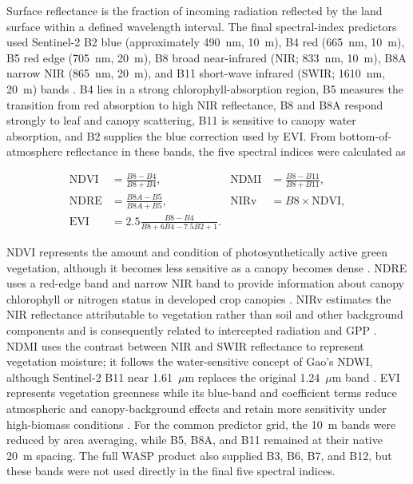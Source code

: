 Surface reflectance is the fraction of incoming radiation reflected by the land surface within a defined wavelength interval. The final spectral-index predictors used Sentinel-2 B2 blue (approximately 490~nm, 10~m), B4 red (665~nm, 10~m), B5 red edge (705~nm, 20~m), B8 broad near-infrared (NIR; 833~nm, 10~m), B8A narrow NIR (865~nm, 20~m), and B11 short-wave infrared (SWIR; 1610~nm, 20~m) bands \cite{hagolle_wasp_2018}. B4 lies in a strong chlorophyll-absorption region, B5 measures the transition from red absorption to high NIR reflectance, B8 and B8A respond strongly to leaf and canopy scattering, B11 is sensitive to canopy water absorption, and B2 supplies the blue correction used by EVI. From bottom-of-atmosphere reflectance in these bands, the five spectral indices were calculated as

\begin{align}
\mathrm{NDVI} &= \frac{B8-B4}{B8+B4},
&
\mathrm{NDMI} &= \frac{B8-B11}{B8+B11},
\label{eq:background_ndvi_ndmi}\\
\mathrm{NDRE} &= \frac{B8A-B5}{B8A+B5},
&
\mathrm{NIRv} &= B8\times\mathrm{NDVI},
\label{eq:background_ndre_nirv}\\
\mathrm{EVI} &= 2.5\frac{B8-B4}{B8+6B4-7.5B2+1}.
\label{eq:background_evi}
\end{align}

NDVI represents the amount and condition of photosynthetically active green vegetation, although it becomes less sensitive as a canopy becomes dense \cite{tucker1979red}. NDRE uses a red-edge band and narrow NIR band to provide information about canopy chlorophyll or nitrogen status in developed crop canopies \cite{barnes2000coincident}. NIRv estimates the NIR reflectance attributable to vegetation rather than soil and other background components and is consequently related to intercepted radiation and GPP \cite{badgley2017canopy}. NDMI uses the contrast between NIR and SWIR reflectance to represent vegetation moisture; it follows the water-sensitive concept of Gao's NDWI, although Sentinel-2 B11 near 1.61~\(\mu\mathrm{m}\) replaces the original 1.24~\(\mu\mathrm{m}\) band \cite{gao1996ndwi}. EVI represents vegetation greenness while its blue-band and coefficient terms reduce atmospheric and canopy-background effects and retain more sensitivity under high-biomass conditions \cite{huete2002overview}. For the common predictor grid, the 10~m bands were reduced by area averaging, while B5, B8A, and B11 remained at their native 20~m spacing. The full WASP product also supplied B3, B6, B7, and B12, but these bands were not used directly in the final five spectral indices.

